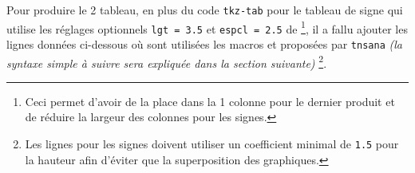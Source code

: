 \documentclass[12pt,a4paper]{article}
\begin{document}
\begin{center}
\end{center}


Pour produire le 2\ieme{} tableau, en plus du code \verb#tkz-tab# pour le tableau de signe qui utilise les réglages optionnels \verb#lgt = 3.5# et 
\verb#espcl = 2.5# de 
\footnote{
	Ceci permet d'avoir de la place dans la 1\iere{} colonne pour le dernier produit et de réduire la largeur des colonnes pour les signes.
},
il a fallu ajouter les lignes données ci-dessous où sont utilisées les macros  et  proposées par \verb+tnsana+ \emph{(la syntaxe simple à suivre sera expliquée dans la section suivante)}
\footnote{
	Les lignes pour les signes doivent utiliser un coefficient minimal de \texttt{1.5} pour la hauteur afin d'éviter que la superposition des graphiques.
}.

\medskip

\begin{latexex-alone}
\end{latexex-alone}
\end{document}
